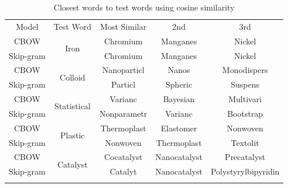 \addtocounter{page}{-2}
\null
\newpage
\addtocounter{page}{1}
\begin{table}[H]
\begin{center}
\caption[Word similarity examinations with cosine similarity]{Closest words to test words using cosine similarity}
\label{tab:COSINESIMS}
\begin{tabular}{||c||c|c|c|c||}
\hline
Model     & Test Word              & Most Similar & 2nd & 3rd \\ \hhline{||=||=|=|=|=||}
CBOW      & \multirow{2}{*}{Iron} & Chromium             &  Manganes   &   Nickel  \\ \cline{1-1} \cline{3-5} 
Skip-gram &                   &  Chromium            &   Manganes  &  Nickel   \\ 
\hhline{||=||=|=|=|=||}
CBOW      & \multirow{2}{*}{Colloid} & Nanoparticl             &  Nanos   &   Monodispers  \\ \cline{1-1} \cline{3-5} 
Skip-gram &                   &  Particl            &   Spheric  &  Suspens   \\ 
\hhline{||=||=|=|=|=||}
CBOW      & \multirow{2}{*}{Statistical} & Varianc             &  Bayesian   &   Multivari  \\ \cline{1-1} \cline{3-5} 
Skip-gram &                   &  Nonparametr            &   Varianc  &  Bootstrap   \\ 
\hhline{||=||=|=|=|=||}
CBOW      & \multirow{2}{*}{Plastic} & Thermoplast             &  Elastomer   & Nonwoven    \\ \cline{1-1} \cline{3-5} 
Skip-gram &                   &  Nonwoven            &   Thermoplast  &  Textolit   \\ 
\hhline{||=||=|=|=|=||}
CBOW      & \multirow{2}{*}{Catalyst} & Cocatalyst             &  Nanocatalyst   & Precatalyst    \\ \cline{1-1} \cline{3-5} 
Skip-gram &                   &  Catalyt            &   Nanocatalyst  &  Polystyrylbipyridin   \\ 
\hhline{||=||=|=|=|=||}
\end{tabular}
\end{center}
\end{table}

